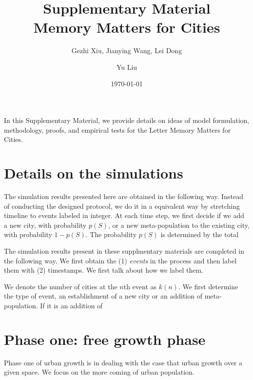\documentclass[aps,prl]{revtex4-1}
\begin{document}
\title{Supplementary Material\\Memory Matters for Cities}
\date{\today}
\author{Gezhi Xiu, Jianying Wang, Lei Dong}

\author{Yu Liu}

\pacs{} 



\maketitle
\tableofcontents
\vspace{1cm}

In this Supplementary Material, we provide details on ideas of model formulation, methodology, proofs, and empirical tests for the Letter Memory Matters for Cities.
\section{Details on the simulations}

The simulation results presented here are obtained in the following way. Instead of conducting the designed protocol, we do it in a equivalent way by stretching timeline to events labeled in integer. At each time step, we first decide if we add a new city, with probability $p(S)$, or a new meta-population to the existing city, with probability $1-p(S)$. The probability $p(S)$ is determined by the total 

The simulation results present in these supplmentary materials are completed in the following way. We first obtain the (1) \emph{events} in the process and then label them with (2) timestamps. We first talk about how we label them. 

We denote the number of cities at the $n$th event as $k(n)$. We first determine the type of event, an establishment of a new city or an addition of meta-population. If it is an addition of 

\section{Phase one: free growth phase}

Phase one of urban growth is in dealing with the case that urban growth over a given space. We focus on the more coming of urban population.
\end{document}
